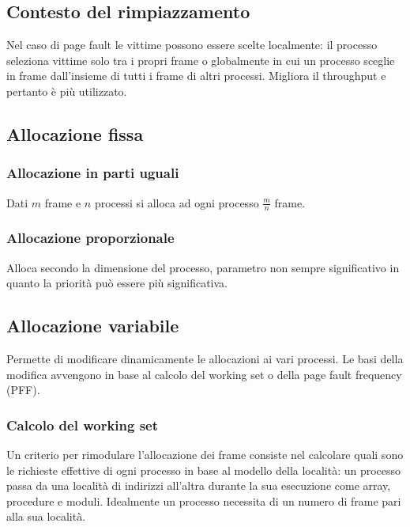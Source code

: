 \subsection{Contesto del rimpiazzamento}
Nel caso di page fault le vittime possono essere scelte localmente: il processo seleziona vittime solo tra i propri frame o globalmente in cui un processo sceglie in frame dall'insieme
di tutti i frame di altri processi. Migliora il throughput e pertanto \`e pi\`u utilizzato. 
\subsection{Allocazione fissa}
\subsubsection{Allocazione in parti uguali}
Dati $m$ frame e $n$ processi si alloca ad ogni processo $\frac{m}{n}$ frame. 
\subsubsection{Allocazione proporzionale}
Alloca secondo la dimensione del processo, parametro non sempre significativo in quanto la priorit\`a pu\`o essere pi\`u significativa. 
\subsection{Allocazione variabile}
Permette di modificare dinamicamente le allocazioni ai vari processi. Le basi della modifica avvengono in base al calcolo del working set o della page fault frequency (PFF). 
\subsubsection{Calcolo del working set}
Un criterio per rimodulare l'allocazione dei frame consiste nel calcolare quali sono le richieste effettive di ogni processo in base al modello della localit\`a: un processo passa
da una localit\`a di indirizzi all'altra durante la sua esecuzione come array, procedure e moduli. Idealmente un processo necessita di un numero di frame pari alla sua localit\`a. 
